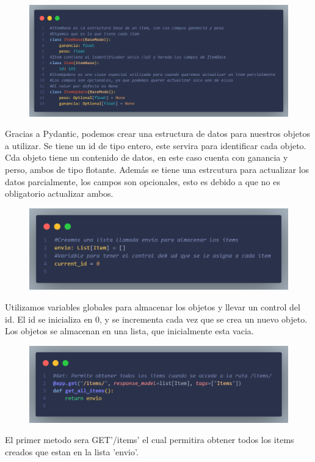 \documentclass[12pt]{article}
\begin{document}
\begin{figure}[H]
    \centering
    \includegraphics[width=1\textwidth]{Imagenes/Captura3_esctructuradatos.png}
\end{figure}

Gracias a Pydantic, podemos crear una estructura de datos para nuestros objetos a utilizar.
Se tiene un id de tipo entero, este servira para identificar cada objeto.
Cda objeto tiene un contenido de datos, en este caso cuenta con ganancia y perso, ambos de tipo flotante.
Además se tiene una estrcutura para actualizar los datos parcialmente, los campos son opcionales, esto es debido a que no es obligatorio actualizar ambos.

\begin{figure}[H]
    \centering
    \includegraphics[width=1\textwidth]{Imagenes/Captura4_variablesGlobales.png}
\end{figure}

Utilizamos variables globales para almacenar los objetos y llevar un control del id.
El id se inicializa en 0, y se incrementa cada vez que se crea un nuevo objeto.
Los objetos se almacenan en una lista, que inicialmente esta vacia.\\

\begin{figure}[H]
    \centering
    \includegraphics[width=1\textwidth]{Imagenes/Captura5_getAll.png}
\end{figure}
El primer metodo sera GET{'/items'} el cual permitira obtener todos los items creados que estan en la lista 'envio'.
\end{document}
